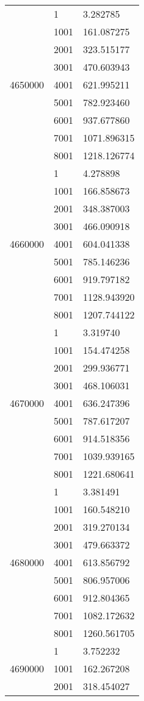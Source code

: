 \begin{table}[htb!]
\begin{tabular}{lll}
\multirow[c]{9}{*}{4650000} & 1 & 3.282785 \\
 & 1001 & 161.087275 \\
 & 2001 & 323.515177 \\
 & 3001 & 470.603943 \\
 & 4001 & 621.995211 \\
 & 5001 & 782.923460 \\
 & 6001 & 937.677860 \\
 & 7001 & 1071.896315 \\
 & 8001 & 1218.126774 \\
\multirow[c]{9}{*}{4660000} & 1 & 4.278898 \\
 & 1001 & 166.858673 \\
 & 2001 & 348.387003 \\
 & 3001 & 466.090918 \\
 & 4001 & 604.041338 \\
 & 5001 & 785.146236 \\
 & 6001 & 919.797182 \\
 & 7001 & 1128.943920 \\
 & 8001 & 1207.744122 \\
\multirow[c]{9}{*}{4670000} & 1 & 3.319740 \\
 & 1001 & 154.474258 \\
 & 2001 & 299.936771 \\
 & 3001 & 468.106031 \\
 & 4001 & 636.247396 \\
 & 5001 & 787.617207 \\
 & 6001 & 914.518356 \\
 & 7001 & 1039.939165 \\
 & 8001 & 1221.680641 \\
\multirow[c]{9}{*}{4680000} & 1 & 3.381491 \\
 & 1001 & 160.548210 \\
 & 2001 & 319.270134 \\
 & 3001 & 479.663372 \\
 & 4001 & 613.856792 \\
 & 5001 & 806.957006 \\
 & 6001 & 912.804365 \\
 & 7001 & 1082.172632 \\
 & 8001 & 1260.561705 \\
\multirow[c]{9}{*}{4690000} & 1 & 3.752232 \\
 & 1001 & 162.267208 \\
 & 2001 & 318.454027 \\

\end{tabular}
\end{table}
